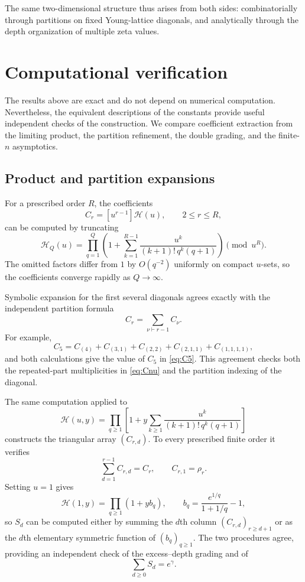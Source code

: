 \documentclass[11pt]{article}
\theoremstyle{definition}
\begin{document}
The same two-dimensional structure thus arises from both sides:
combinatorially through partitions on fixed Young-lattice diagonals,
and analytically through the depth organization of multiple zeta
values.

\section{Computational verification}
\label{sec:computations}

The results above are exact and do not depend on numerical
computation.  Nevertheless, the equivalent descriptions of the
constants provide useful independent checks of the construction.  We
compare coefficient extraction from the limiting product, the
partition refinement, the double grading, and the finite-$n$
asymptotics.

\subsection{Product and partition expansions}

For a prescribed order $R$, the coefficients
\[
        C_r=[u^{r-1}]\mathcal H(u),
        \qquad 2\leq r\leq R,
\]
can be computed by truncating
\[
 \mathcal H_Q(u)
 =
 \prod_{q=1}^{Q}
 \left(
 1+\sum_{k=1}^{R-1}
 \frac{u^k}{(k+1)!\,q^k(q+1)}
 \right)
 \pmod{u^R}.
\]
The omitted factors differ from $1$ by $O(q^{-2})$ uniformly on
compact $u$-sets, so the coefficients converge rapidly as
$Q\to\infty$.

Symbolic expansion for the first several diagonals agrees exactly
with the independent partition formula
\[
        C_r=\sum_{\nu\vdash r-1}C_\nu.
\]
For example,
\[
 C_5
 =
 C_{(4)}+C_{(3,1)}+C_{(2,2)}
 +C_{(2,1,1)}+C_{(1,1,1,1)},
\]
and both calculations give the value of $C_5$ in
\eqref{eq:C5}.  This agreement checks both the repeated-part
multiplicities in \eqref{eq:Cnu} and the partition indexing of the
diagonal.

The same computation applied to
\[
 \mathscr H(u,y)
 =
 \prod_{q\geq1}
 \left[
 1+
 y\sum_{k\geq1}
 \frac{u^k}{(k+1)!\,q^k(q+1)}
 \right]
\]
constructs the triangular array $(C_{r,d})$.  To every prescribed
finite order it verifies
\[
        \sum_{d=1}^{r-1}C_{r,d}=C_r,
        \qquad
        C_{r,1}=\rho_r.
\]
Setting $u=1$ gives
\[
 \mathscr H(1,y)=\prod_{q\geq1}(1+yb_q),
 \qquad
 b_q=\frac{e^{1/q}}{1+1/q}-1,
\]
so $S_d$ can be computed either by summing the $d$th column
$(C_{r,d})_{r\geq d+1}$ or as the $d$th elementary symmetric
function of $(b_q)_{q\geq1}$.  The two procedures agree, providing an
independent check of the excess--depth grading and of
\[
        \sum_{d\geq0}S_d=e^\gamma.
\]
\end{document}
